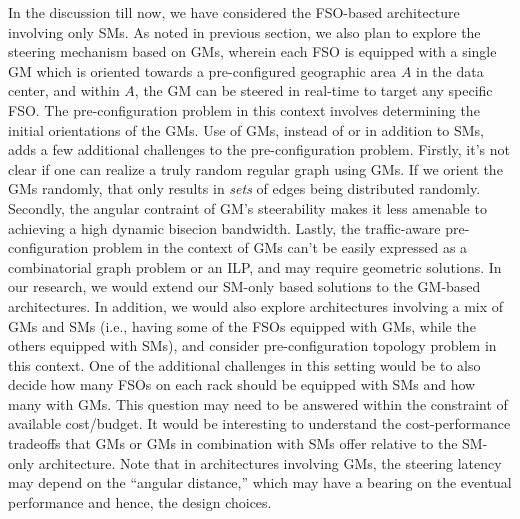   In the discussion till
now, we have considered the FSO-based architecture involving only SMs.
As noted in previous section, we also plan to explore the steering
mechanism based on GMs, wherein each FSO is equipped with a single GM
which is oriented towards a pre-configured geographic area $A$ in the
data center, and within $A$, the GM can be steered in real-time to
target any specific FSO. The pre-configuration problem in this context
involves determining the initial orientations of the GMs.
%
Use of GMs, instead of or in addition to SMs, adds a few additional
challenges to the pre-configuration problem. Firstly, it's not clear
if one can realize a truly random regular graph using GMs.  If we
orient the GMs randomly, that only results in {\em sets} of edges
being distributed randomly. 
% 
Secondly, the angular contraint of GM's steerability makes it less
amenable to achieving a high dynamic bisecion bandwidth.
%
Lastly, the traffic-aware pre-configuration problem in the context 
of GMs can't be easily expressed as a combinatorial graph problem
or an ILP, and may require geometric solutions.
%
In our research, we would extend our SM-only based solutions to the
GM-based architectures.
%
In addition, we would also explore architectures involving a mix of
GMs and SMs (i.e., having some of the FSOs equipped with GMs, while
the others equipped with SMs), and consider pre-configuration topology
problem in this context. One of the additional challenges in this
setting would be to also decide how many FSOs on each rack should
be equipped with SMs and how many with GMs. This question may need
to be answered within the constraint of available cost/budget. 
%
It would be interesting to understand the cost-performance tradeoffs
that GMs or GMs in combination with SMs offer relative to the SM-only
architecture. Note that in architectures involving GMs, the steering
latency may depend on the ``angular distance,'' which may have a
bearing on the eventual performance and hence, the design choices.

